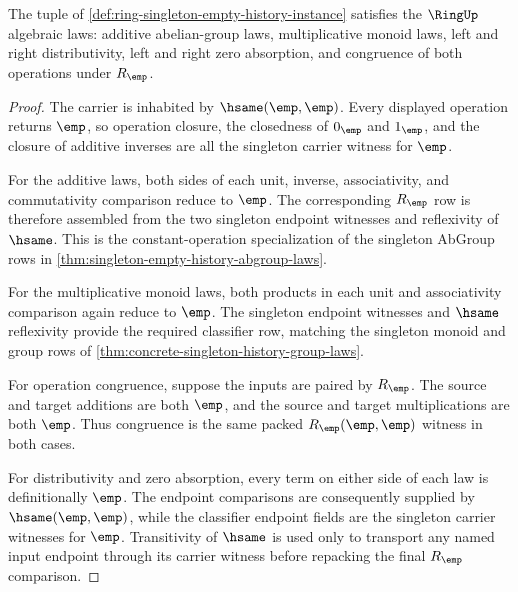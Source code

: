 \begin{theorem}
\label{thm:ring-singleton-empty-history-laws}
The tuple of \autoref{def:ring-singleton-empty-history-instance} satisfies
the $\RingUp$ algebraic laws: additive abelian-group laws, multiplicative
monoid laws, left and right distributivity, left and right zero absorption,
and congruence of both operations under $R_{\emp}$.
\end{theorem}
\begin{proof}
The carrier is inhabited by $\hsame(\emp,\emp)$. Every displayed operation
returns $\emp$, so operation closure, the closedness of $0_{\emp}$ and
$1_{\emp}$, and the closure of additive inverses are all the singleton carrier
witness for $\emp$.

For the additive laws, both sides of each unit, inverse, associativity, and
commutativity comparison reduce to $\emp$. The corresponding $R_{\emp}$ row is
therefore assembled from the two singleton endpoint witnesses and reflexivity
of $\hsame$. This is the constant-operation specialization of the singleton
AbGroup rows in \autoref{thm:singleton-empty-history-abgroup-laws}.

For the multiplicative monoid laws, both products in each unit and
associativity comparison again reduce to $\emp$. The singleton endpoint
witnesses and $\hsame$ reflexivity provide the required classifier row, matching
the singleton monoid and group rows of
\autoref{thm:concrete-singleton-history-group-laws}.

For operation congruence, suppose the inputs are paired by $R_{\emp}$. The
source and target additions are both $\emp$, and the source and target
multiplications are both $\emp$. Thus congruence is the same packed
$R_{\emp}(\emp,\emp)$ witness in both cases.

For distributivity and zero absorption, every term on either side of each law
is definitionally $\emp$. The endpoint comparisons are consequently supplied
by $\hsame(\emp,\emp)$, while the classifier endpoint fields are the singleton
carrier witnesses for $\emp$. Transitivity of $\hsame$ is used only to
transport any named input endpoint through its carrier witness before repacking
the final $R_{\emp}$ comparison.
\end{proof}

